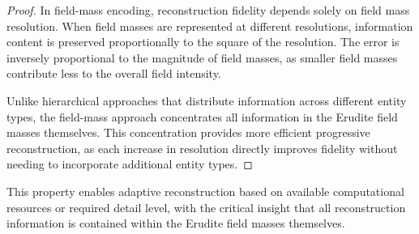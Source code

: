 \begin{proof}
In field-mass encoding, reconstruction fidelity depends solely on field mass resolution. When field masses are represented at different resolutions, information content is preserved proportionally to the square of the resolution. The error is inversely proportional to the magnitude of field masses, as smaller field masses contribute less to the overall field intensity.

Unlike hierarchical approaches that distribute information across different entity types, the field-mass approach concentrates all information in the Erudite field masses themselves. This concentration provides more efficient progressive reconstruction, as each increase in resolution directly improves fidelity without needing to incorporate additional entity types.
\end{proof}

This property enables adaptive reconstruction based on available computational resources or required detail level, with the critical insight that all reconstruction information is contained within the Erudite field masses themselves.

